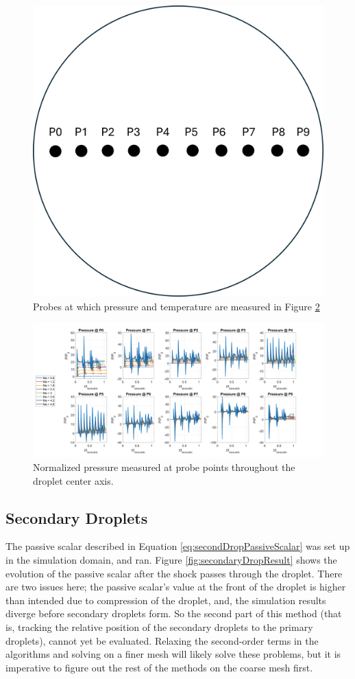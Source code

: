 \documentclass{UCF_ETD}
\begin{document}
\begin{figure}
    \centering
    \includegraphics[width=0.5\linewidth]{Figures/probes_points.png}
    \caption{Probes at which pressure and temperature are measured in Figure \ref{fig:pressure_mach_sweep}}
    \label{fig:point_probes}
\end{figure}

\begin{figure}
    \centering
    \includegraphics[width=\textwidth,height=\textheight,keepaspectratio]{Figures/pressures_Mach_sweep.png}
    \caption{Normalized pressure measured at probe points throughout the droplet center axis.}
    \label{fig:pressure_mach_sweep}
\end{figure}

\subsection{Secondary Droplets}
\label{subsec:secondaryDropResults}
The passive scalar described in Equation \ref{eq:secondDropPassiveScalar} was set up in the simulation domain, and ran. Figure \ref{fig:secondaryDropResult} shows the evolution of the passive scalar after the shock passes through the droplet. There are two issues here; the passive scalar's value at the front of the droplet is higher than intended due to compression of the droplet, and, the simulation results diverge before secondary droplets form. So the second part of this method (that is, tracking the relative position of the secondary droplets to the primary droplets), cannot yet be evaluated. Relaxing the second-order terms in the algorithms and solving on a finer mesh will likely solve these problems, but it is imperative to figure out the rest of the methods on the coarse mesh first. 
\end{document}
